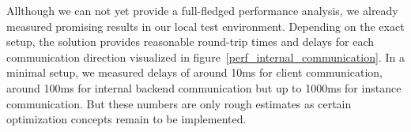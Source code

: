 \documentclass[runningheads]{llncs}
\begin{document}
Allthough we can not yet provide a full-fledged performance analysis,
we already measured promising results in our local test environment.
Depending on the exact setup,
the solution provides
reasonable round-trip times and delays for each communication direction
visualized in figure~\ref{perf_internal_communication}.
In a minimal setup, we measured delays of around 10ms for client communication,
around 100ms for internal backend communication
but up to 1000ms for instance communication.
But these numbers are only rough estimates
as certain optimization concepts remain to be implemented.
\end{document}

